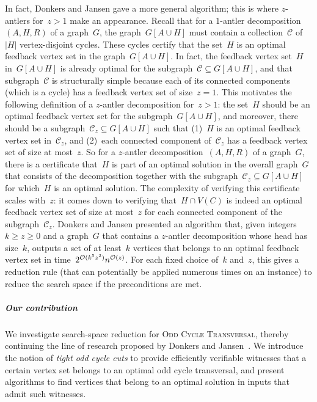 In fact, Donkers and Jansen gave a more general algorithm; this is where $z$-antlers for~$z > 1$ make an appearance. Recall that for a $1$-antler decomposition~$(A,H,R)$ of a graph~$G$, the graph~$G[A \cup H]$ must contain a collection~$\mathcal{C}$ of~$|H|$ vertex-disjoint cycles. These cycles certify that the set~$H$ is an optimal feedback vertex set in the graph~$G[A \cup H]$. In fact, the feedback vertex set~$H$ in~$G[A \cup H]$ is already optimal for the subgraph~$\mathcal{C} \subseteq G[A \cup H]$, and that subgraph~$\mathcal{C}$ is structurally simple because each of its connected components (which is a cycle) has a feedback vertex set of size~$z=1$. This motivates the following definition of a $z$-antler decomposition for~$z>1$: the set~$H$ should be an optimal feedback vertex set for the subgraph~$G[A \cup H]$, and moreover, there should be a subgraph~$\mathcal{C}_z \subseteq G[A \cup H]$ such that (1)~$H$ is an optimal feedback vertex set in~$\mathcal{C}_z$, and (2)~each connected component of~$\mathcal{C}_z$ has a feedback vertex set of size at most~$z$. So for a $z$-antler decomposition~$(A,H,R)$ of a graph~$G$, there is a certificate that~$H$ is part of an optimal solution in the overall graph~$G$ that consists of the decomposition together with the subgraph~$\mathcal{C}_z \subseteq G[A \cup H]$ for which~$H$ is an optimal solution. The complexity of verifying this certificate scales with~$z$: it comes down to verifying that~$H \cap V(C)$ is indeed an optimal feedback vertex set of size at most~$z$ for each connected component of the subgraph~$\mathcal{C}_z$. Donkers and Jansen presented an algorithm that, given integers~$k \geq z \geq 0$ and a graph~$G$ that contains a $z$-antler decomposition whose head has size~$k$, outputs a set of at least~$k$ vertices that belongs to an optimal feedback vertex set in time~$2^{\mathcal{O}(k^5 z^2)} n^{\mathcal{O}(z)}$. For each fixed choice of~$k$ and~$z$, this gives a reduction rule (that can potentially be applied numerous times on an instance) to reduce the search space if the preconditions are met.

\subparagraph*{Our contribution} We investigate search-space reduction for \textsc{Odd Cycle Transversal}, thereby continuing the line of research proposed by Donkers and Jansen~\cite{DonkersJ24}. We introduce the notion of \emph{tight odd cycle cuts} to provide efficiently verifiable witnesses that a certain vertex set belongs to an optimal odd cycle transversal, and present algorithms to find vertices that belong to an optimal solution in inputs that admit such witnesses.

